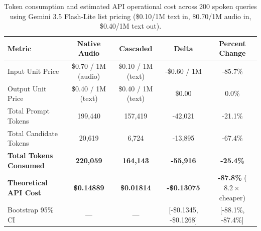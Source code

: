 \begin{table}[t]
\centering
\small
\caption{Token consumption and estimated API operational cost across 200 spoken queries using Gemini 3.5 Flash-Lite list pricing (\$0.10/1M text in, \$0.70/1M audio in, \$0.40/1M text out).}
\label{tab:cost}
\begin{tabular}{lcccc}
\toprule
\textbf{Metric} & \textbf{Native Audio} & \textbf{Cascaded} & \textbf{Delta} & \textbf{Percent Change} \\
\midrule
Input Unit Price & \$0.70 / 1M (audio) & \$0.10 / 1M (text) & -\$0.60 / 1M & -85.7\% \\
Output Unit Price & \$0.40 / 1M (text) & \$0.40 / 1M (text) & \$0.00 & 0.0\% \\
\midrule
Total Prompt Tokens & 199,440 & 157,419 & -42,021 & -21.1\% \\
Total Candidate Tokens & 20,619 & 6,724 & -13,895 & -67.4\% \\
\textbf{Total Tokens Consumed} & \textbf{220,059} & \textbf{164,143} & \textbf{-55,916} & \textbf{-25.4\%} \\
\midrule
\textbf{Theoretical API Cost} & \textbf{\$0.14889} & \textbf{\$0.01814} & \textbf{-\$0.13075} & \textbf{-87.8\%} ($8.2\times$ cheaper) \\
Bootstrap 95\% CI & --- & --- & [-\$0.1345, -\$0.1268] & [-88.1\%, -87.4\%] \\
\bottomrule
\end{tabular}
\end{table}
